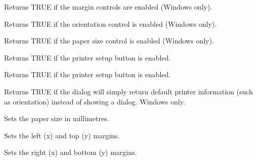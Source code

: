Returns TRUE if the margin controls are enabled (Windows only).

\label{wxpagesetupdatagetenableorientation}


Returns TRUE if the orientation control is enabled (Windows only).

\label{wxpagesetupdatagetenablepaper}


Returns TRUE if the paper size control is enabled (Windows only).

\label{wxpagesetupdatagetenableprinter}


Returns TRUE if the printer setup button is enabled.

\label{wxpagesetupdatagetenablehelp}


Returns TRUE if the printer setup button is enabled.

\label{wxpagesetupdatagetdefaultinfo}


Returns TRUE if the dialog will simply return default printer information (such as orientation)
instead of showing a dialog. Windows only.

\label{wxpagesetupdatasetpapersize}


Sets the paper size in millimetres.

\label{wxpagesetupdatasetmargintopleft}


Sets the left (x) and top (y) margins.

\label{wxpagesetupdatasetmarginbottomright}


Sets the right (x) and bottom (y) margins.


